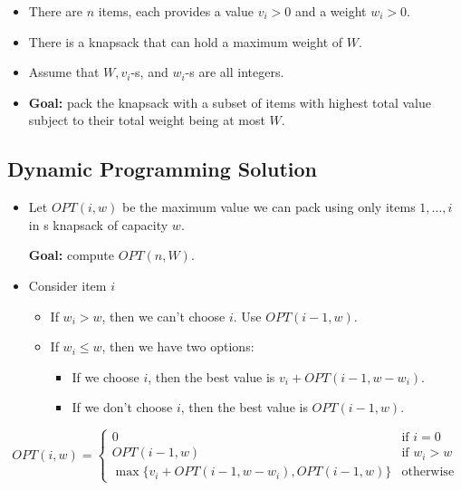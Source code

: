 \begin{itemize}
    \item There are $n$ items, each provides a value $v_i > 0$ and a weight $w_i > 0$.
    \item There is a knapsack that can hold a maximum weight of $W$.
    \item Assume that $W, v_i$-s, and $w_i$-s are all integers.
    \item \textbf{Goal:} pack the knapsack with a subset of items with highest total value subject to their total weight being at most $W$. 
\end{itemize}

\subsection{Dynamic Programming Solution}

\begin{itemize}
    \item Let $OPT(i, w)$ be the maximum value we can pack using only items $1, \dots, i$ in s knapsack of capacity $w$.
    
    \textbf{Goal:} compute $OPT(n, W)$.

    \item Consider item $i$ 
    
    \begin{itemize}
        \item If $w_i > w$, then we can't choose $i$. Use $OPT(i - 1, w)$.
        \item If $w_i \leq w$, then we have two options:
        \begin{itemize}
            \item If we choose $i$, then the best value is $v_i + OPT(i - 1, w - w_i)$.
            \item If we don't choose $i$, then the best value is $OPT(i - 1, w)$.
        \end{itemize}
    \end{itemize}
\end{itemize} 

\[
    OPT(i, w) = \begin{cases}
        0                                                & \text{if } i = 0   \\
        OPT(i - 1, w)                                    & \text{if } w_i > w \\
        \max\{v_i + OPT(i - 1, w - w_i), OPT(i - 1, w)\} & \text{otherwise}
    \end{cases}
\]

